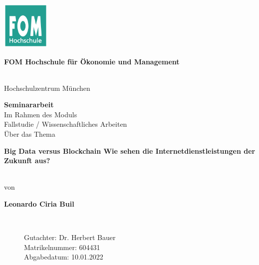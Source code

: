 \newcommand{\Thema}{Big Data versus Blockchain \linebreak Wie sehen die Internetdienstleistungen der Zukunft aus?}
\newcommand{\Name}{Leonardo Ciria Buil}
\newcommand{\Gutachter}{Dr. Herbert Bauer}
\newcommand{\Matrikelnummer}{604431}
\newcommand{\Abgabedatum}{10.01.2022}




\begin{titlepage}
	\begin{center}
		\includegraphics[width=2.3cm]{assets/fomLogo.pdf}\\
		\vspace{.5cm}
		\begin{Large}\textbf{FOM Hochschule für Ökonomie und Management}\end{Large}\\
		\vspace{.5cm}
		Hochschulzentrum München

		\vspace{2cm}
	\end{center}

	\bigskip

	\begin{center}
		\textbf{Seminararbeit}\\
		\vspace{0.2cm}
		Im Rahmen des Moduls\\
		\vspace{0.5cm}
		Fallstudie / Wissenschaftliches Arbeiten\\
		\vspace{2cm}
		Über das Thema\\
		\vspace{0.5cm}
		\begin{Large}\textbf{\textbf{\Thema}}\end{Large}\\

		\vspace{2cm}
		von\\
		\vspace{0.5cm}
		\begin{Large}\textbf{\textbf{\Name}}\end{Large}\\
	\end{center}

	\begin{figure}[b]

		Gutachter: \Gutachter       \\
		Matrikelnummer: \Matrikelnummer \\
		Abgabedatum: \Abgabedatum
	\end{figure}

\end{titlepage}